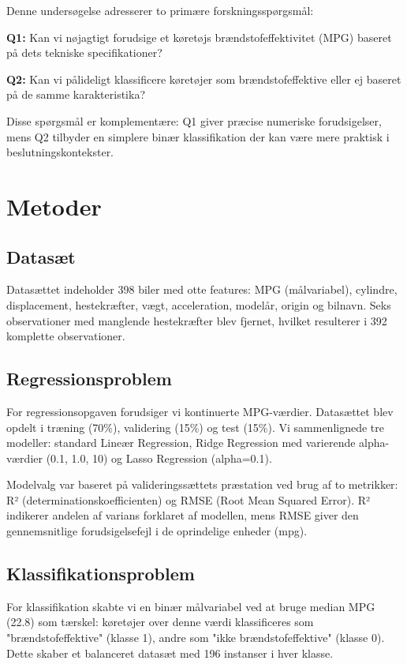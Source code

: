 \documentclass[a4paper, twocolumn]{article}
\begin{document}
Denne undersøgelse adresserer to primære forskningsspørgsmål:

\textbf{Q1:} Kan vi nøjagtigt forudsige et køretøjs brændstofeffektivitet (MPG) baseret på dets tekniske specifikationer?

\textbf{Q2:} Kan vi pålideligt klassificere køretøjer som brændstofeffektive eller ej baseret på de samme karakteristika?

Disse spørgsmål er komplementære: Q1 giver præcise numeriske forudsigelser, mens Q2 tilbyder en simplere binær klassifikation der kan være mere praktisk i beslutningskontekster.

\section{Metoder}
\label{sec:methods}

\subsection{Datasæt}
Datasættet indeholder 398 biler med otte features: MPG (målvariabel), cylindre, displacement, hestekræfter, vægt, acceleration, modelår, origin og bilnavn. Seks observationer med manglende hestekræfter blev fjernet, hvilket resulterer i 392 komplette observationer.

\subsection{Regressionsproblem}
For regressionsopgaven forudsiger vi kontinuerte MPG-værdier. Datasættet blev opdelt i træning (70\%), validering (15\%) og test (15\%). Vi sammenlignede tre modeller: standard Lineær Regression, Ridge Regression med varierende alpha-værdier (0.1, 1.0, 10) og Lasso Regression (alpha=0.1).

Modelvalg var baseret på valideringssættets præstation ved brug af to metrikker: R² (determinationskoefficienten) og RMSE (Root Mean Squared Error). R² indikerer andelen af varians forklaret af modellen, mens RMSE giver den gennemsnitlige forudsigelsefejl i de oprindelige enheder (mpg).

\subsection{Klassifikationsproblem}
For klassifikation skabte vi en binær målvariabel ved at bruge median MPG (22.8) som tærskel: køretøjer over denne værdi klassificeres som "brændstofeffektive" (klasse 1), andre som "ikke brændstofeffektive" (klasse 0). Dette skaber et balanceret datasæt med 196 instanser i hver klasse.
\end{document}
